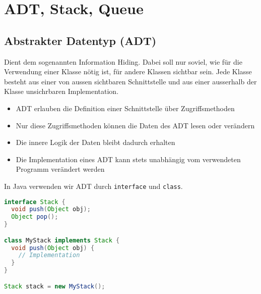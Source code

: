 \section{ADT, Stack, Queue}
\subsection{Abstrakter Datentyp (ADT)}

Dient dem sogenannten Information Hiding. Dabei soll nur soviel, wie für die Verwendung einer Klasse nötig ist, für andere Klassen sichtbar sein. Jede Klasse besteht aus einer von aussen sichtbaren Schnittstelle und aus einer ausserhalb der Klasse unsichrbaren Implementation.

\begin{itemize}
  \item ADT erlauben die Definition einer Schnittstelle über Zugriffsmethoden
  \item Nur diese Zugriffsmethoden können die Daten des ADT lesen oder verändern
  \item Die innere Logik der Daten bleibt dadurch erhalten
  \item Die Implementation eines ADT kann stets unabhängig vom verwendeten Programm verändert werden
\end{itemize}

In Java verwenden wir ADT durch \texttt{interface} und \texttt{class}.

\begin{lstlisting}[language=Java]
	interface Stack {
  void push(Object obj);
  Object pop();
}

class MyStack implements Stack {
  void push(Object obj) {
    // Implementation
  }
}

Stack stack = new MyStack();
\end{lstlisting}


